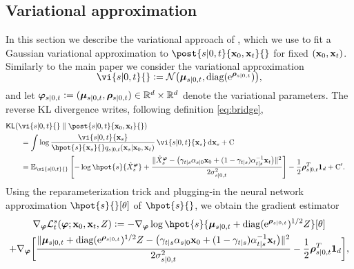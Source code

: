 \subsection{Variational approximation}
\label{apdx-sec:vi-approx}
In this section we describe the variational approach of \citet{moufad2024variational}, which we use to fit a Gaussian variational approximation to $\post{s|0, t}{\bx_0, \bx_t}{}$ for fixed $(\mathbf{x}_0, \mathbf{x}_t)$. Similarly to the main paper we consider the variational approximation 
\begin{equation} 
    \smash{\vi{s|0, t}{} \eqdef \gauss\big(\vmu_{s|0, t}, \diag(\rme^{\vlstd_{s|0,t}})\big)}, 
\end{equation}
and let ${\bm\varphi}_{s|0, t} \vcentcolon= ({\bm\mu}_{s|0, t}, {\bm\rho}_{s|0,t}) \in \mathbb{R}^{{d}} \times \mathbb{R}^{{d}}$ denote the variational parameters. 
The reverse KL divergence writes, following definition \eqref{eq:bridge}, 
\begin{align} 
    \lefteqn{\kldivergence{\vi{s|0, t}{}}{\post{s|0, t}{\bx_0, \bx_t}{}}} \nonumber \\
    & \hspace{.7cm} = \int \log \frac{\vi{s|0, t}{\bx_s}}{\hpot{s}{\bx_s}{} \fw{s|0, t}{\bx_0, \bx_t}{\bx_s}} \, \vi{s|0, t}{\bx_s} \, \rmd \bx_s + \mathrm{C} \nonumber \\
    & \hspace{.7cm} = \pE _{\vi{s|0, t}{}} \left[ - \log \hpot{s}{\vX^\vparam _s} + \frac{\| \vX^\vparam _s - \big( \gamma_{t|s} \a_{s|0} \bx_0 + (1 - \gamma_{t|s}) \a^{-1} _{t|s} \bx_t \big) \|^2}{2 \std^2 _{s|0, t}} \right] - \frac{1}{2} \vlstd_{s|0, t}^T \mathbf{1}_d + \mathrm{C}^\prime. \label{eq:gradient-estimator} 
\end{align}
Using the reparameterization trick \cite{kingma2013auto} and plugging-in the neural network approximation $\hpot{s}{}[\param]$ of $\hpot{s}{}$, we obtain the gradient estimator  
\begin{multline*}
    \nabla_\vparam \mathcal{L}^s _t(\vparam; \bx_0, \bx_t, Z) \eqdef - \nabla_\vparam \log \hpot{s}{\vmu_{s|0, t} + \diag(\rme^{\vlstd_{s|0, t} })^{1/2} Z}[\param] \\
     + \nabla_\vparam \bigg[ \frac{\|\vmu_{s|0, t} + \diag(\rme^{\vlstd_{s|0, t} })^{1/2} Z - \big( \gamma_{t|s} \a_{s|0} \bx_0 + (1 - \gamma_{t|s}) \a^{-1} _{t|s} \bx_t \big)\|^2 }{2 \std^2 _{s|0, t}} - \frac{1}{2} \vlstd_{s|0, t}^T \mathbf{1}_d \bigg], 
\end{multline*}
